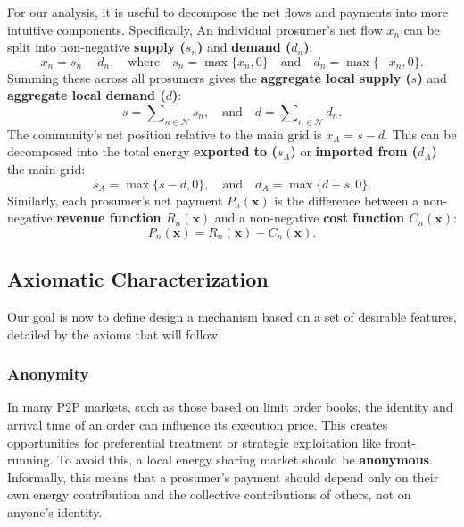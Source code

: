 \documentclass[12pt, notitlepage]{article}
\begin{document}
For our analysis, it is useful to decompose the net flows and payments into more intuitive components. Specifically, An individual prosumer's net flow $x_n$ can be split into non-negative \textbf{supply ($s_n$)} and \textbf{demand ($d_n$)}:
\begin{equation}
    x_n = s_n - d_n, \quad \text{where} \quad s_n = \max\{x_n, 0\} \quad \text{and} \quad d_n = \max\{-x_n, 0\}.
\end{equation}
Summing these across all prosumers gives the \textbf{aggregate local supply ($s$)} and \textbf{aggregate local demand ($d$)}:
\begin{equation}
    s = \sum\nolimits_{n \in \mathcal{N}} s_n, \quad \text{and} \quad d = \sum\nolimits_{n \in \mathcal{N}} d_n.
\end{equation}
The community's net position relative to the main grid is $x_A = s - d$. This can be decomposed into the total energy \textbf{exported to ($s_A$)} or \textbf{imported from ($d_A$)} the main grid:
\begin{equation}
    s_A = \max\{s-d, 0\}, \quad \text{and} \quad d_A = \max\{d-s, 0\}.
\end{equation}
Similarly, each prosumer's net payment $P_n(\bm{x})$ is the difference between a non-negative \textbf{revenue function $R_n(\bm{x})$} and a non-negative \textbf{cost function $C_n(\bm{x})$}:
\begin{equation}
    P_n(\bm{x}) = R_n(\bm{x}) - C_n(\bm{x}).
\end{equation}

\subsection{Axiomatic Characterization}

Our goal is now to define design a mechanism based on a set of desirable features, detailed by the axioms that will follow. 

\subsubsection{Anonymity}

In many P2P markets, such as those based on limit order books, the identity and arrival time of an order can influence its execution price. This creates opportunities for preferential treatment or strategic exploitation like front-running. To avoid this, a local energy sharing market should be \textbf{anonymous}. Informally, this means that a prosumer's payment should depend only on their own energy contribution and the collective contributions of others, not on anyone's identity.
\end{document}

